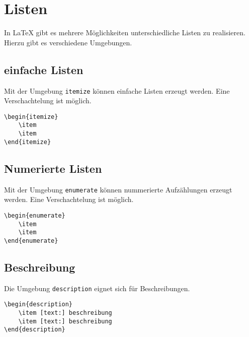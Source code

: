 \chapter{Listen}
In \LaTeX{} gibt es mehrere Möglichkeiten unterschiedliche Listen zu realisieren. Hierzu gibt es verschiedene Umgebungen.

\section{einfache Listen}
Mit der Umgebung \verb=itemize= können einfache Listen erzeugt werden. Eine Verschachtelung ist möglich.

\begin{lstlisting}[caption={\texttt{itemize}-Liste}]
\begin{itemize}
	\item
	\item
\end{itemize}
\end{lstlisting}

\section{Numerierte Listen}
Mit der Umgebung \verb=enumerate= können nummerierte Aufzählungen erzeugt werden. Eine Verschachtelung ist möglich.

\begin{lstlisting}[caption={\texttt{enumerate}-Liste}]
\begin{enumerate}
	\item
	\item
\end{enumerate}
\end{lstlisting}
\newpage
\section{Beschreibung}
Die Umgebung \verb=description= eignet sich für Beschreibungen.

\begin{lstlisting}[caption={\texttt{itemize}-Liste}]
\begin{description}
	\item [text:] beschreibung
	\item [text:] beschreibung
\end{description}
\end{lstlisting}

